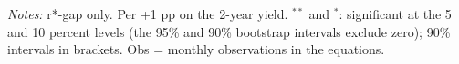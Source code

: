 \begin{flushleft}\footnotesize\textit{Notes:} r*-gap only. Per +1 pp on the 2-year yield. $^{**}$ and $^{*}$: significant at the 5 and 10 percent levels (the 95\% and 90\% bootstrap intervals exclude zero); 90\% intervals in brackets. Obs = monthly observations in the equations.\end{flushleft}
\endgroup
